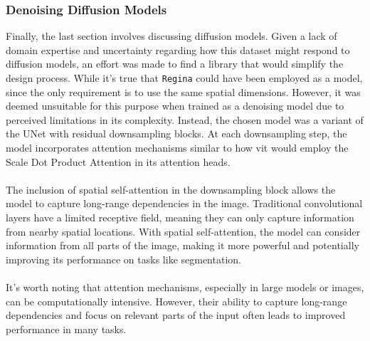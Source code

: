 \subsubsection{Denoising Diffusion Models}
Finally, the last section involves discussing diffusion models. Given a lack of domain expertise and uncertainty regarding how this dataset might respond to diffusion models, an effort was made to find a library that would simplify the design process. While it's true that \texttt{Regina} could have been employed as a model, since the only requirement is to use the same spatial dimensions. However, it was deemed unsuitable for this purpose when trained as a denoising model due to perceived limitations in its complexity. Instead, the chosen model was a variant of the UNet with residual downsampling blocks. At each downsampling step, the model incorporates attention mechanisms similar to how \gls{vit} would employ the Scale Dot Product Attention in its attention heads.
\\
\\
The inclusion of spatial self-attention in the downsampling block allows the model to capture long-range dependencies in the image. Traditional convolutional layers have a limited receptive field, meaning they can only capture information from nearby spatial locations. With spatial self-attention, the model can consider information from all parts of the image, making it more powerful and potentially improving its performance on tasks like segmentation.
\\
\\
It's worth noting that attention mechanisms, especially in large models or images, can be computationally intensive. However, their ability to capture long-range dependencies and focus on relevant parts of the input often leads to improved performance in many tasks.
